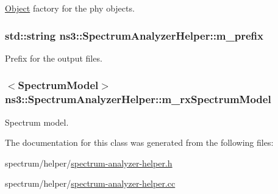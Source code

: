 \hyperlink{classns3_1_1Object}{Object} factory for the phy objects. 

\subsubsection[{\texorpdfstring{m\+\_\+prefix}{m_prefix}}]{\setlength{\rightskip}{0pt plus 5cm}std\+::string ns3\+::\+Spectrum\+Analyzer\+Helper\+::m\+\_\+prefix\hspace{0.3cm}{\ttfamily [private]}}\hypertarget{classns3_1_1SpectrumAnalyzerHelper_ac8e562a06ed94a4c76b8a0acdb6de16d}{}\label{classns3_1_1SpectrumAnalyzerHelper_ac8e562a06ed94a4c76b8a0acdb6de16d}


Prefix for the output files. 

\subsubsection[{\texorpdfstring{m\+\_\+rx\+Spectrum\+Model}{m_rxSpectrumModel}}]{$<${\bf Spectrum\+Model}$>$ ns3\+::\+Spectrum\+Analyzer\+Helper\+::m\+\_\+rx\+Spectrum\+Model\hspace{0.3cm}{\ttfamily [private]}}\hypertarget{classns3_1_1SpectrumAnalyzerHelper_a335d8920926adc5e812c0facefa61686}{}\label{classns3_1_1SpectrumAnalyzerHelper_a335d8920926adc5e812c0facefa61686}


Spectrum model. 



The documentation for this class was generated from the following files\+:\begin{DoxyCompactItemize}
\item 
spectrum/helper/\hyperlink{spectrum-analyzer-helper_8h}{spectrum-\/analyzer-\/helper.\+h}\item 
spectrum/helper/\hyperlink{spectrum-analyzer-helper_8cc}{spectrum-\/analyzer-\/helper.\+cc}\end{DoxyCompactItemize}
